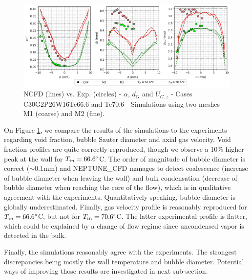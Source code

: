 


%
\begin{figure}[h!]
\centering
\includegraphics[scale=0.60]{img/DEBORA/c30.png}
\caption{NCFD (lines) vs. Exp. (circles) - $\alpha$, $d_{G}$ and $U_{G,z}$ - Cases C30G2P26W16Te66.6 and Te70.6 - Simulations using two meshes M1 (coarse) and M2 (fine).}
\label{fig:topology_res}
\end{figure}
%

On Figure \ref{fig:topology_res}, we compare the results of the simulations to the experiments regarding void fraction, bubble Sauter diameter and axial gas velocity. Void fraction profiles are quite correctly reproduced, though we observe a $10\%$ higher peak at the wall for $T_{in}=66.6\degree$C. The order of magnitude of bubble diameter is correct ($\sim 0.1\text{mm}$) and NEPTUNE\_CFD manages to detect coalescence (increase of bubble diameter when leaving the wall) and bulk condensation (decrease of bubble diameter when reaching the core of the flow), which is in qualitative agreement with the experiments. Quantitatively speaking, bubble diameter is globally underestimated. Finally, gas velocity profile is reasonably reproduced for $T_{in}=66.6\degree$C, but not for $T_{in}=70.6\degree$C. The latter experimental profile is flatter, which could be explained by a change of flow regime since uncondensed vapor is detected in the bulk.  

Finally, the simulations reasonably agree with the experiments. The strongest discrepancies being mostly the wall temperature and bubble diameter. Potential ways of improving those results are investigated in next sub-section.

